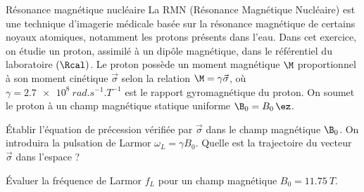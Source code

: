 

\begin{exo}[PC][1][TD]{Résonance magnétique nucléaire}
	La RMN (Résonance Magnétique Nucléaire) est une technique d'imagerie médicale basée sur la résonance magnétique de certains noyaux atomiques, notamment les protons présents dans l'eau. Dans cet exercice, on
	étudie un proton, assimilé à un dipôle magnétique, dans le référentiel du laboratoire $(\Rcal)$. Le proton possède un moment magnétique $\M$ proportionnel à son moment cinétique $\Vec{\sigma}$ selon la relation $\M = \gamma \Vec{\sigma}$, où $\gamma = \SI{2.7e8}{rad.s^{-1}.T^{-1}}$ est le rapport gyromagnétique du proton. 
	 On soumet le proton à un champ magnétique statique uniforme $\B_0 = B_0 \,\ez$.
\begin{quest}
\item Établir l'équation de précession vérifiée par  $\Vec{\sigma}$ dans le champ magnétique $\B_0$. On introduira la pulsation de Larmor $\omega_L = \gamma B_0$.
Quelle est la trajectoire du vecteur $\Vec{\sigma}$ dans l’espace ?
\item Évaluer la fréquence de Larmor $f_L$ pour un champ magnétique $B_0 = \SI{11.75}{T}$.
\end{quest}


\end{exo}
